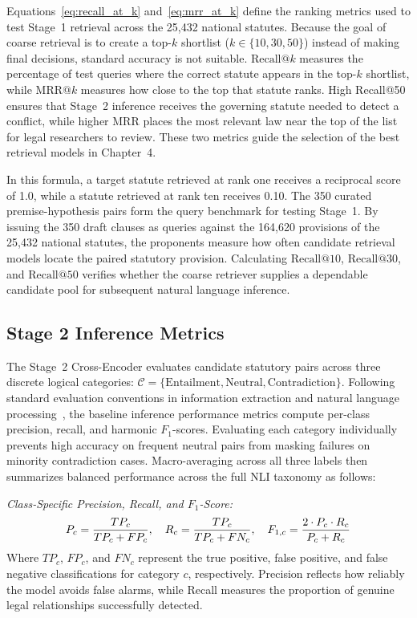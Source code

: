     Equations~\ref{eq:recall_at_k} and~\ref{eq:mrr_at_k} define the ranking metrics used to test Stage~1 retrieval across the 25,432 national statutes. Because the goal of coarse retrieval is to create a top-$k$ shortlist ($k \in \{10, 30, 50\}$) instead of making final decisions, standard accuracy is not suitable. $\text{Recall@}k$ measures the percentage of test queries where the correct statute appears in the top-$k$ shortlist, while $\text{MRR@}k$ measures how close to the top that statute ranks. High Recall@50 ensures that Stage~2 inference receives the governing statute needed to detect a conflict, while higher MRR places the most relevant law near the top of the list for legal researchers to review. These two metrics guide the selection of the best retrieval models in Chapter~4.

    In this formula, a target statute retrieved at rank one receives a reciprocal score of 1.0, while a statute retrieved at rank ten receives 0.10. The 350 curated premise-hypothesis pairs form the query benchmark for testing Stage~1. By issuing the 350 draft clauses as queries against the 164,620 provisions of the 25,432 national statutes, the proponents measure how often candidate retrieval models locate the paired statutory provision. Calculating $\text{Recall@}10$, $\text{Recall@}30$, and $\text{Recall@}50$ verifies whether the coarse retriever supplies a dependable candidate pool for subsequent natural language inference.

    \subsection{Stage 2 Inference Metrics}
    \label{sec:stage2_metrics}
    The Stage~2 Cross-Encoder evaluates candidate statutory pairs across three discrete logical categories: $\mathcal{C} = \{\text{Entailment}, \text{Neutral}, \text{Contradiction}\}$. Following standard evaluation conventions in information extraction and natural language processing~\cite{chinchor1992muc4, vanrijsbergen1979information}, the baseline inference performance metrics compute per-class precision, recall, and harmonic $F_1$-scores. Evaluating each category individually prevents high accuracy on frequent neutral pairs from masking failures on minority contradiction cases. Macro-averaging across all three labels then summarizes balanced performance across the full NLI taxonomy as follows:

    \noindent\textit{Class-Specific Precision, Recall, and $F_1$-Score:}
    \begin{equation}
        P_c = \frac{TP_c}{TP_c + FP_c}, \quad R_c = \frac{TP_c}{TP_c + FN_c}, \quad F_{1,c} = \frac{2 \cdot P_c \cdot R_c}{P_c + R_c}
        \label{eq:class_metrics}
        \eqcaption{Class-Specific Precision, Recall, and $F_1$-Score}
    \end{equation}
    \noindent Where $TP_c$, $FP_c$, and $FN_c$ represent the true positive, false positive, and false negative classifications for category $c$, respectively. Precision reflects how reliably the model avoids false alarms, while Recall measures the proportion of genuine legal relationships successfully detected.

